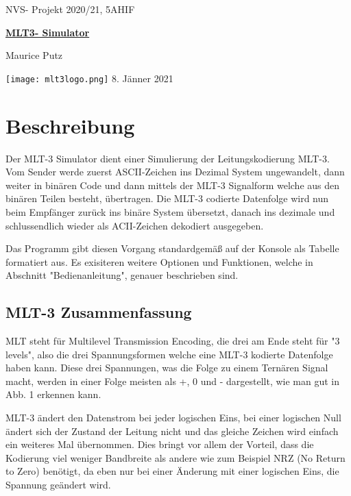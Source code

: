 \documentclass{article}
\begin{document}
\begin{titlepage}
    \centering
NVS- Projekt 2020/21, 5AHIF

\vskip4cm
    {\bfseries\Large
        \huge\underline{MLT3- Simulator}

	Maurice Putz\\
    }
    \texttt{[image: mlt3logo.png]}
    \vskip6cm
 8. Jänner 2021\\
\end{titlepage}

\newpage
\tableofcontents
\newpage
{}

\section{Beschreibung}

Der MLT-3 Simulator dient einer Simulierung der Leitungskodierung MLT-3. Vom Sender werde zuerst ASCII-Zeichen 
ins Dezimal System ungewandelt, dann weiter in binären Code und dann mittels der MLT-3 Signalform welche aus
den binären Teilen besteht, übertragen. Die MLT-3 codierte Datenfolge wird nun beim Empfänger zurück ins binäre System
übersetzt, danach ins dezimale und schlussendlich wieder als ACII-Zeichen dekodiert ausgegeben.

Das Programm gibt diesen Vorgang standardgemäß auf der Konsole als Tabelle formatiert aus. Es exisiteren weitere
Optionen und Funktionen, welche in Abschnitt "Bedienanleitung", genauer beschrieben sind.

\subsection{MLT-3 Zusammenfassung}

MLT steht für Multilevel Transmission Encoding, die drei am Ende steht für "3 levels", also die drei Spannungsformen welche eine
MLT-3 kodierte Datenfolge haben kann. Diese drei Spannungen, was die Folge zu einem Ternären Signal macht,
werden in einer Folge meisten als +, 0 und - dargestellt, wie man gut in Abb. 1 erkennen kann.

MLT-3 ändert den Datenstrom bei jeder logischen Eins, bei einer logischen Null ändert sich der Zustand der Leitung nicht und das
gleiche Zeichen wird einfach ein weiteres Mal übernommen. Dies bringt vor allem der Vorteil, dass die Kodierung viel weniger Bandbreite als
andere wie zum Beispiel NRZ (No Return to Zero) benötigt, da eben nur bei einer Änderung mit einer logischen Eins, die Spannung geändert wird.
\end{document}
